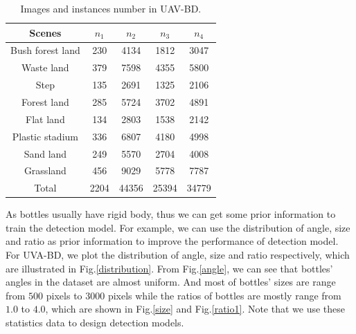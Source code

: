 \begin{table}
	\centering
	\small
	\caption{Images and instances number in UAV-BD.}
	\label{statistics}
	\begin{tabular}{@{}ccc|cc@{}}
		\toprule
		Scenes     & $n_1$& $n_2$ & $n_3$ & $n_4$  \\ \midrule
		Bush forest land       & 230  & 4134  & 1812  & 3047  \\
		Waste land     & 379  & 7598  & 4355  & 5800  \\
		Step       & 135  & 2691  & 1325  & 2106  \\
		Forest land    & 285  & 5724  & 3702  & 4891  \\
		Flat land       & 134  & 2803  & 1538  & 2142  \\
		Plastic stadium & 336  & 6807  & 4180  & 4998  \\
		Sand land       & 249  & 5570  & 2704  & 4008  \\
		Grassland       & 456  & 9029  & 5778  & 7787  \\ \midrule
		Total      & 2204 & 44356 & 25394 & 34779 \\ \bottomrule
	\end{tabular}
\end{table}


As bottles usually have rigid body, thus we can get some prior information to train the detection model. For example, we can use the distribution of angle, size and ratio as prior information to improve the performance of detection model. For UVA-BD, we plot the distribution of angle, size and ratio respectively, which are illustrated in Fig.\ref{distribution}. From Fig.\ref{angle}, we can see that bottles' angles in the dataset are almost uniform. And most of bottles' sizes are range from $500 $ pixels to $ 3000 $ pixels while the ratios of bottles are mostly range from $ 1.0 $ to $ 4.0 $, which are shown in Fig.\ref{size} and Fig.\ref{ratio1}. Note that we use these statistics data to design detection models.



